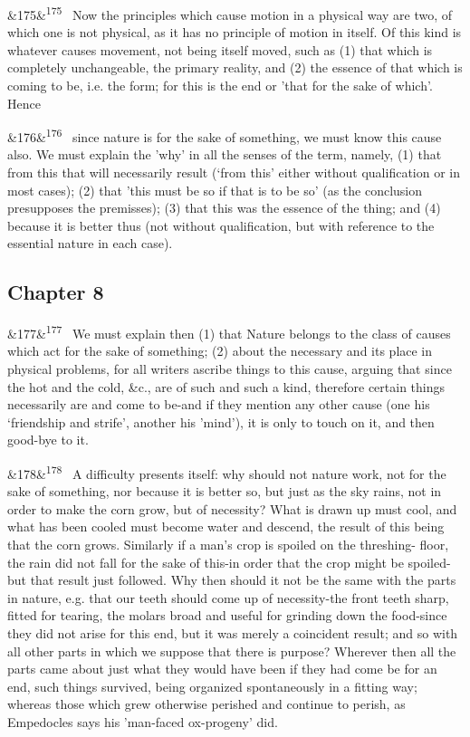 \documentclass[12pt]{article}
\newcommand{\para}[1][]{\par\noindent\ifx&#1&\else\textsuperscript{\footnotesize #1}~\fi}
\begin{document}
\para[175] Now the principles which cause motion in a physical way are two, of which one is not physical, as it has no principle of motion in itself. Of this kind is whatever causes movement, not being itself moved, such as (1) that which is completely unchangeable, the primary reality, and (2) the essence of that which is coming to be, i.e. the form; for this is the end or 'that for the sake of which'. Hence

\para[176] since nature is for the sake of something, we must know this cause also. We must explain the 'why' in all the senses of the term, namely, (1) that from this that will necessarily result (‘from this’ either without qualification or in most cases); (2) that 'this must be so if that is to be so' (as the conclusion presupposes the premisses); (3) that this was the essence of the thing; and (4) because it is better thus (not without qualification, but with reference to the essential nature in each case).

\subsection*{Chapter 8}

\para[177] We must explain then (1) that Nature belongs to the class of causes which act for the sake of something; (2) about the necessary and its place in physical problems, for all writers ascribe things to this cause, arguing that since the hot and the cold, \&c., are of such and such a kind, therefore certain things necessarily are and come to be-and if they mention any other cause (one his ‘friendship and strife', another his 'mind’), it is only to touch on it, and then good-bye to it.

\para[178] A difficulty presents itself: why should not nature work, not for the sake of something, nor because it is better so, but just as the sky rains, not in order to make the corn grow, but of necessity? What is drawn up must cool, and what has been cooled must become water and descend, the result of this being that the corn grows. Similarly if a man's crop is spoiled on the threshing- floor, the rain did not fall for the sake of this-in order that the crop might be spoiled-but that result just followed. Why then should it not be the same with the parts in nature, e.g. that our teeth should come up of necessity-the front teeth sharp, fitted for tearing, the molars broad and useful for grinding down the food-since they did not arise for this end, but it was merely a coincident result; and so with all other parts in which we suppose that there is purpose? Wherever then all the parts came about just what they would have been if they had come be for an end, such things survived, being organized spontaneously in a fitting way; whereas those which grew otherwise perished and continue to perish, as Empedocles says his 'man-faced ox-progeny' did.
\end{document}
